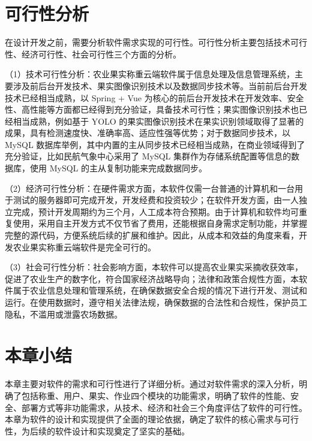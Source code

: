 \section{可行性分析}\label{sec:req3}

在设计开发之前，需要分析软件需求实现的可行性。可行性分析主要包括技术可行性、经济可行性、社会可行性三个方面的分析\cite{叶俊民2006软件工程}。

（1）技术可行性分析：农业果实称重云端软件属于信息处理及信息管理系统，主要涉及前后台开发技术、果实图像识别技术以及数据同步技术等。当前前后台开发技术已经相当成熟，以 Spring + Vue 为核心的前后台开发技术在开发效率、安全性、高性能等方面都已经得到充分验证\cite{Qiu2021}\cite{Shan2021}，具备技术可行性；果实图像识别技术也已经相当成熟，例如基于 YOLO 的果实图像识别技术在果实识别领域取得了显著的成果，具有检测速度快、准确率高、适应性强等优势\cite{Lin2019}；对于数据同步技术，以 MySQL 数据库举例，其中内置的主从同步技术已经相当成熟，在商业领域得到了充分验证，比如民航气象中心采用了 MySQL 集群作为存储系统配置等信息的数据库，使用 MySQL 的主从复制功能来完成数据同步\cite{厍雯轩-2024}。

（2）经济可行性分析：在硬件需求方面，本软件仅需一台普通的计算机和一台用于测试的服务器即可完成开发，开发经费和投资较少；在软件开发方面，由一人独立完成，预计开发周期约为三个月，人工成本符合预期。由于计算机和软件均可重复使用，采用自主开发方式不仅节省了费用，还能根据自身需求定制功能，并掌握完整的源代码，方便系统后续的扩展和维护。因此，从成本和效益的角度来看，开发农业果实称重云端软件是完全可行的。

（3）社会可行性分析：社会影响方面，本软件可以提高农业果实采摘收获效率，促进了农业生产的数字化，符合国家经济战略导向\cite{Xu2020}；法律和政策合规性方面，本软件属于农业信息处理和管理系统，在确保数据安全合规的情况下进行开发、测试和运行。在使用数据时，遵守相关法律法规，确保数据的合法性和合规性，保护员工隐私，不滥用或泄露农场数据。

\section{本章小结}

本章主要对软件的需求和可行性进行了详细分析。通过对软件需求的深入分析，明确了包括称重、用户、果实、作业四个模块的功能需求，明确了软件的性能、安全、部署方式等非功能需求，从技术、经济和社会三个角度评估了软件的可行性。本章为软件的设计和实现提供了全面的理论依据，确定了软件的核心需求与可行性，为后续的软件设计和实现奠定了坚实的基础。
